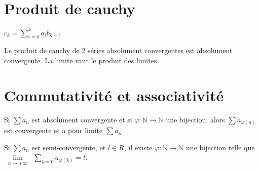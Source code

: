 \documentclass[french]{yLectureNote}
\newcommand{\Lim}[1]{\lim\limits_{\substack{#1}}\:}
\newcommand{\N}[0]{\mathbb{N}}
\begin{document}
 \section{Produit de cauchy}
 \begin{definition}
 \(c_k = \sum_{i=0}^k a_ib_{k-i}\)
 \end{definition}
 \begin{theorem}[]
  Le produit de cauchy de 2 séries absolument convergentes est absolument convergente. La limite vaut le produit des limites
 \end{theorem}
 \section{Commutativité et associativité}
 \begin{theorem}
 Si \(\sum a_n\) est absolument convergente et si \(\varphi : \N \to \N\) une bijection, alors \(\sum a_{\varphi(n)}\) est convergente et a pour limite \(\sum a_n\).
 \end{theorem}
 \begin{theorem}
  Si \(\sum a_n\) est semi-convergente, et \(l\in \bar{R}\), il existe \(\varphi : \N \to \N\) une bijection telle que \(\Lim{n\to + \infty} \sum_{k=0}^, a_{\varphi(k)} = l\).
 \end{theorem}
\end{document}
